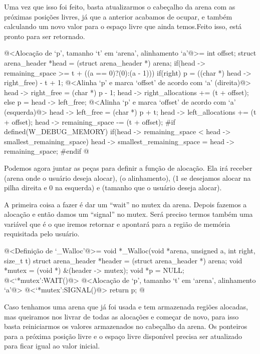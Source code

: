 Uma vez que isso foi feito, basta atualizarmos o cabeçalho da arena
com as próximas posições livres, já que a anterior acabamos de ocupar,
e também calculando um novo valor para o espaço livre que ainda
temos.Feito isso,
 está pronto para ser retornado.

\iniciocodigo
@<Alocação de `p', tamanho `t' em `arena', alinhamento `a'@>=
{
  int offset;
  struct arena_header *head = (struct arena_header *) arena;
  if(head -> remaining_space >= t + ((a == 0)?(0):(a - 1))){
    if(right){
      p = ((char *) head -> right_free) - t + 1;
      @<Alinha `p' e marca `offset' de acordo com `a' (direita)@>
      head -> right_free = (char *) p - 1;
      head -> right_allocations += (t + offset);
    }
    else{
      p = head -> left_free;
      @<Alinha `p' e marca `offset' de acordo com `a' (esquerda)@>
      head -> left_free = (char *) p + t;
      head -> left_allocations += (t + offset);
    }
    head -> remaining_space -= (t + offset);
#if defined(W_DEBUG_MEMORY)
    if(head -> remaining_space < head -> smallest_remaining_space)
      head -> smallest_remaining_space = head -> remaining_space;
#endif
  }
}
@
\fimcodigo


Podemos agora juntar as peças para definir a função de alocação. Ela
irá receber  (arena onde o usuário deseja alocar),
 (o alinhamento),  (1 se desejamos
alocar na pilha direita e 0 na esquerda) e  (tamanho que
o usuário deseja alocar).

A primeira coisa a fazer é dar um ``wait'' no mutex da arena. Depois
fazemos a alocação e então damos um ``signal'' no mutex. Será preciso
termos também uma variável  que é o que iremos retornar
e apontará para a região de memória requisitada pelo usuário.


\iniciocodigo
@<Definição de `\_Walloc'@>=
void *_Walloc(void *arena, unsigned a, int right, size_t t){
  struct arena_header *header = (struct arena_header *) arena;
  void *mutex = (void *) &(header -> mutex);
  void *p = NULL;
  @<`*mutex':WAIT()@>
  @<Alocação de `p', tamanho `t' em `arena', alinhamento `a'@>
  @<`*mutex':SIGNAL()@>
  return p;
}
@
\fimcodigo


Caso tenhamos uma arena que já foi usada e tem armazenada regiões
alocadas, mas queiramos nos livrar de todas as alocações e começar de
novo, para isso basta reiniciarmos os valores armazenados no cabeçalho
da arena. Os ponteiros para a próxima posição livre e o espaço livre
disponível precisa ser atualizado para ficar igual ao valor inicial.

